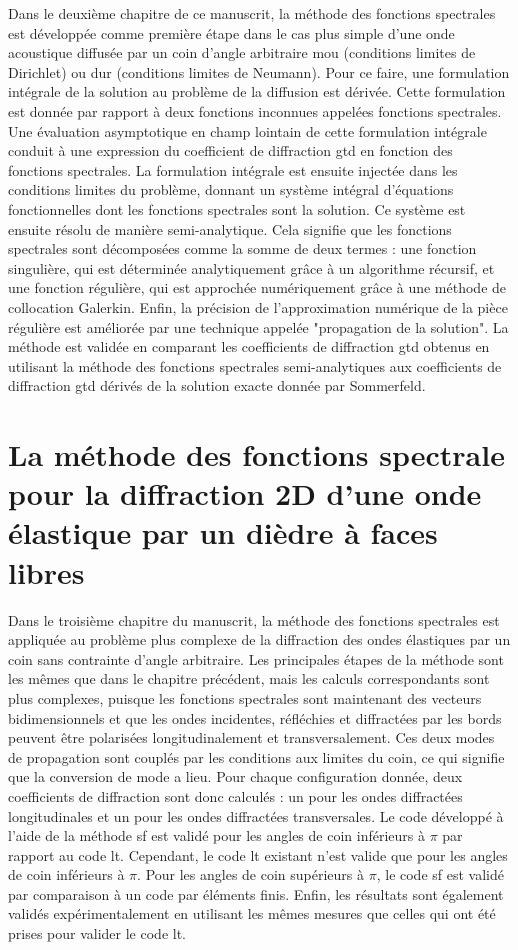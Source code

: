Dans le deuxième chapitre de ce manuscrit, la méthode des fonctions spectrales est développée comme première étape dans le cas plus simple d'une onde acoustique diffusée par un coin d'angle arbitraire mou (conditions limites de Dirichlet) ou dur (conditions limites de Neumann). Pour ce faire, une formulation intégrale de la solution au problème de la diffusion est dérivée. Cette formulation est donnée par rapport à deux fonctions inconnues appelées fonctions spectrales. Une évaluation asymptotique en champ lointain de cette formulation intégrale conduit à une expression du coefficient de diffraction \acrshort{gtd} en fonction des fonctions spectrales. La formulation intégrale est ensuite injectée dans les conditions limites du problème, donnant un système intégral d'équations fonctionnelles dont les fonctions spectrales sont la solution. Ce système est ensuite résolu de manière semi-analytique. Cela signifie que les fonctions spectrales sont décomposées comme la somme de deux termes : une fonction singulière, qui est déterminée analytiquement grâce à un algorithme récursif, et une fonction régulière, qui est approchée numériquement grâce à une méthode de collocation Galerkin. Enfin, la précision de l'approximation numérique de la pièce régulière est améliorée par une technique appelée "propagation de la solution". La méthode est validée en comparant les coefficients de diffraction \acrshort{gtd} obtenus en utilisant la méthode des fonctions spectrales semi-analytiques aux coefficients de diffraction \acrshort{gtd} dérivés de la solution exacte donnée par Sommerfeld.

\section{La méthode des fonctions spectrale pour la diffraction 2D d'une onde élastique par un dièdre à faces libres}

Dans le troisième chapitre du manuscrit, la méthode des fonctions spectrales est appliquée au problème plus complexe de la diffraction des ondes élastiques par un coin sans contrainte d'angle arbitraire. Les principales étapes de la méthode sont les mêmes que dans le chapitre précédent, mais les calculs correspondants sont plus complexes, puisque les fonctions spectrales sont maintenant des vecteurs bidimensionnels et que les ondes incidentes, réfléchies et diffractées par les bords peuvent être polarisées longitudinalement et transversalement. Ces deux modes de propagation sont couplés par les conditions aux limites du coin, ce qui signifie que la conversion de mode a lieu. Pour chaque configuration donnée, deux coefficients de diffraction sont donc calculés : un pour les ondes diffractées longitudinales et un pour les ondes diffractées transversales. Le code développé à l'aide de la méthode \acrfull{sf} est validé pour les angles de coin inférieurs à $\pi$ par rapport au code \acrfull{lt}. Cependant, le code \acrshort{lt} existant n'est valide que pour les angles de coin inférieurs à $\pi$. Pour les angles de coin supérieurs à $\pi$, le code \acrshort{sf} est validé par comparaison à un code par éléments finis. Enfin, les résultats sont également validés expérimentalement en utilisant les mêmes mesures que celles qui ont été prises pour valider le code \acrshort{lt}.

